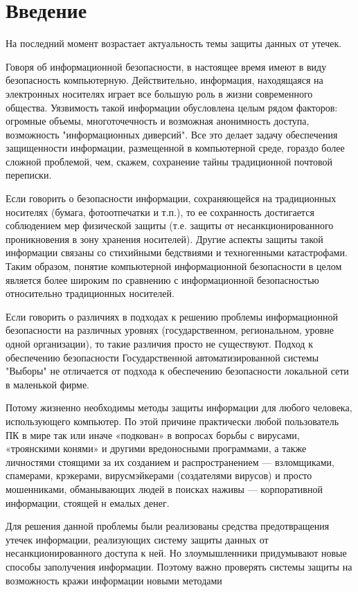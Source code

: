 \chapter*{Введение}

На последний момент возрастает актуальность темы защиты данных от утечек.
 
Говоря об информационной безопасности, в настоящее время имеют в виду безопасность компьютерную. Действительно, информация, находящаяся на электронных носителях играет все большую роль в жизни современного общества. Уязвимость такой информации обусловлена целым рядом факторов: огромные объемы, многоточечность и возможная анонимность доступа, возможность "информационных диверсий". Все это делает задачу обеспечения защищенности информации, размещенной в компьютерной среде, гораздо более сложной проблемой, чем, скажем, сохранение тайны традиционной почтовой переписки.

Если говорить о безопасности информации, сохраняющейся на традиционных носителях (бумага, фотоотпечатки и т.п.), то ее сохранность достигается соблюдением мер физической защиты (т.е. защиты от несанкционированного проникновения в зону хранения носителей). Другие аспекты защиты такой информации связаны со стихийными бедствиями и техногенными катастрофами. Таким образом, понятие компьютерной информационной безопасности в целом является более широким по сравнению с информационной безопасностью относительно традиционных носителей.

Если говорить о различиях в подходах к решению проблемы информационной безопасности на различных уровнях (государственном, региональном, уровне одной организации), то такие различия просто не существуют. Подход к обеспечению безопасности Государственной автоматизированной системы "Выборы" не отличается от подхода к обеспечению безопасности локальной сети в маленькой фирме.

Потому жизненно необходимы методы защиты информации для любого человека, использующего компьютер. По этой причине практически любой пользователь ПК в мире так или иначе «подкован» в вопросах борьбы с вирусами, «троянскими конями» и другими вредоносными программами, а также личностями стоящими за их созданием и распространением — взломщиками, спамерами, крэкерами, вирусмэйкерами (создателями вирусов) и просто мошенниками, обманывающих людей в поисках наживы — корпоративной информации, стоящей н
емалых денег.

Для решения данной проблемы были реализованы средства предотвращения утечек информации, реализующих систему защиты данных от несанкционированного доступа к ней. Но злоумышленники придумывают новые способы заполучения информации. Поэтому важно проверять системы защиты на возможность кражи информации новыми методами


